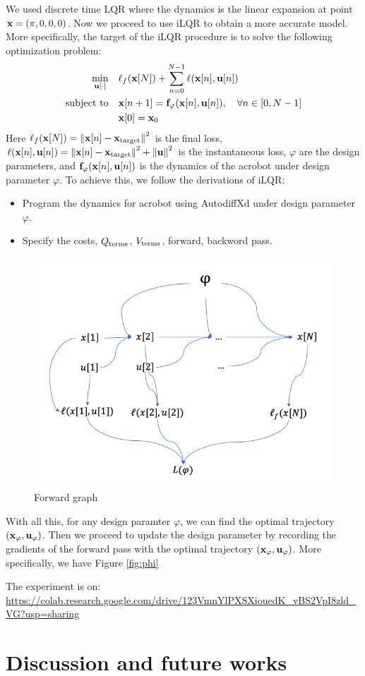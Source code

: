 \documentclass[conference]{IEEEtran}
\begin{document}
We used discrete time LQR where the dynamics is the linear expansion at point $\mathbf{x} = (\pi,0,0,0)$. Now we proceed to use iLQR to obtain a more accurate model. More specifically, the target of the iLQR procedure is to solve the following optimization problem:
\begin{align*} \min_{\mathbf{u}[\cdot]} \quad & \ell_f(\mathbf{x}[N]) +
    \sum_{n=0}^{N-1} \ell(\mathbf{x}[n],\mathbf{u}[n]) \\ \text{subject to} \quad & \mathbf{x}[n+1] = {\bf
    f_\varphi}(\mathbf{x}[n], \mathbf{u}[n]), \quad \forall n\in[0, N-1] \\ & \mathbf{x}[0] = \mathbf{x}_0
\end{align*}
Here $\ell_f(\mathbf{x}[N]) = \left\|{\mathbf{x}[n] - \mathbf{x}_{\rm target}}\right\|^2$ is the final loss, $\ell(\mathbf{x}[n],\mathbf{u}[n]) = \left\|{\mathbf{x}[n] - \mathbf{x}_{\rm target}}\right\|^2 + \left\|{\mathbf{u}}\right\|^2$ is the instantaneous loss, $\varphi$ are the design parameters, and $\mathbf{f}_\varphi(\mathbf{x}[n],\mathbf{u}[n])$ is the dynamics of the acrobot under design parameter $\varphi$. To achieve this, we follow the derivations of iLQR:
\begin{itemize}
    \setlength{\itemsep}{0pt}
    \setlength{\parsep}{0pt}
    \setlength{\parskip}{0pt}
    \item Program the dynamics for acrobot using AutodiffXd under design parameter $\varphi$.
    \item Specify the costs, $Q_{\rm terms}$, $V_{\rm terms}$, forward, backword pass.
\end{itemize}
\begin{figure}[!h]
\label{fig:phi}
\centering
\includegraphics[width=.5\textwidth]{forward_phi.png}
\caption{Forward graph}
\label{}
\end{figure}
With all this, for any design paramter $\varphi$, we can find the optimal trajectory $(\mathbf{x}_\varphi,\mathbf{u}_\varphi)$. Then we proceed to update the design parameter by recording the gradients of the forward pass with the optimal trajectory $(\mathbf{x}_\varphi,\mathbf{u}_\varphi)$. More specifically, we have Figure \ref{fig:phi}

The experiment is on: \url{https://colab.research.google.com/drive/123VmnYlPXSXiouedK_vBS2VpI8zld_VG?usp=sharing}


\section{Discussion and future works}






\end{document}
